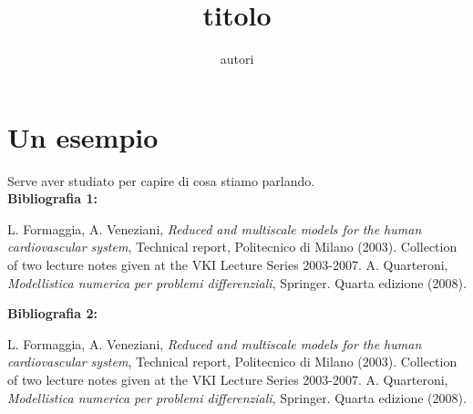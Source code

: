 \documentclass{article}
\title{titolo}
\author{autori}
\begin{document}
\maketitle

\tableofcontents

\section{Un esempio}

Serve aver studiato \cite[Cap. 2]{quarteroni} per capire di cosa stiamo parlando. \\[\baselineskip]
\textbf{Bibliografia 1:}
\begin{thebibliography}{9} %
    L. Formaggia, A. Veneziani, \emph{Reduced and multiscale models for the human cardiovascular system},
    Technical report, Politecnico di Milano (2003).
    Collection of two lecture notes given at the VKI Lecture Series 2003-2007.
    A. Quarteroni, \emph{Modellistica numerica per problemi differenziali},
    Springer. Quarta edizione (2008).
\end{thebibliography}

\textbf{Bibliografia 2:}
\begin{thebibliography}{For.Ven. 2003} %
    	L. Formaggia, A. Veneziani, \emph{Reduced and multiscale models for the human cardiovascular system},
        Technical report, Politecnico di Milano (2003).
        Collection of two lecture notes given at the VKI Lecture Series 2003-2007.
    	A. Quarteroni, \emph{Modellistica numerica per problemi differenziali},
        Springer. Quarta edizione (2008).
\end{thebibliography}
\end{document}
